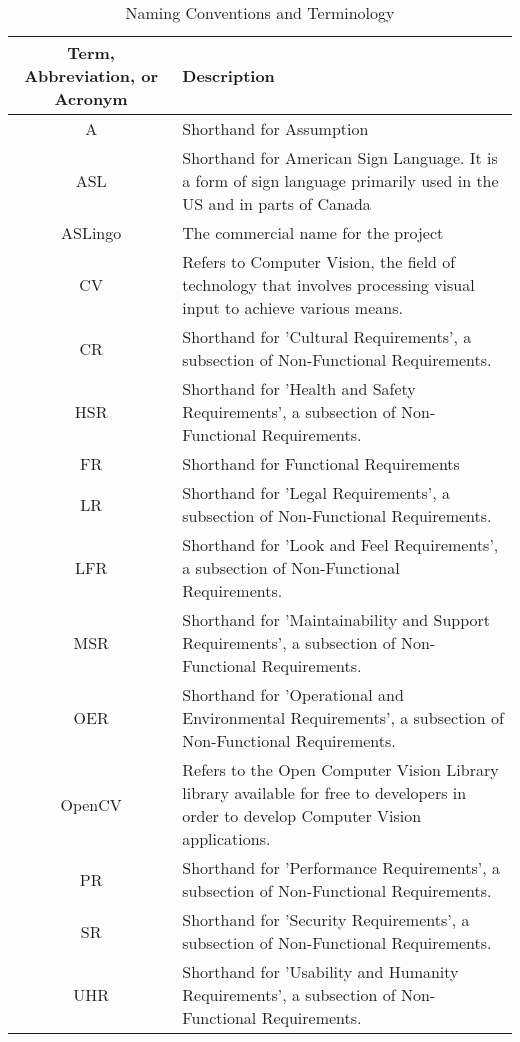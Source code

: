 \documentclass[12pt, titlepage]{article}
\begin{document}
\begin{longtable}{| c | p{7cm} |}
\caption{Naming Conventions and Terminology} \\
\hline
\textbf{Term, Abbreviation, or Acronym} & \textbf{Description}\\
\hline
A & Shorthand for Assumption\\
\hline
ASL & Shorthand for American Sign Language. It is a form of sign language primarily used in the US and in parts of Canada\\
\hline
ASLingo & The commercial name for the project\\
\hline
CV & Refers to Computer Vision, the field of technology that involves processing visual input to achieve various means.\\
\hline
CR & Shorthand for 'Cultural Requirements', a subsection of Non-Functional Requirements.\\
\hline
HSR & Shorthand for 'Health and Safety Requirements', a subsection of Non-Functional Requirements.\\
\hline
FR & Shorthand for Functional Requirements\\
\hline
LR & Shorthand for 'Legal Requirements', a subsection of Non-Functional Requirements.\\
\hline
LFR & Shorthand for 'Look and Feel Requirements', a subsection of Non-Functional Requirements.\\
\hline
MSR & Shorthand for 'Maintainability and Support Requirements', a subsection of Non-Functional Requirements.\\
\hline
OER & Shorthand for 'Operational and Environmental Requirements', a subsection of Non-Functional Requirements.\\
\hline
OpenCV & Refers to the Open Computer Vision Library library available for free to developers in order to develop Computer Vision applications.\\
\hline
PR & Shorthand for 'Performance Requirements', a subsection of Non-Functional Requirements.\\
\hline
SR & Shorthand for 'Security Requirements', a subsection of Non-Functional Requirements.\\
\hline
UHR & Shorthand for 'Usability and Humanity Requirements', a subsection of Non-Functional Requirements.\\
\bottomrule
\end{longtable}

\newpage

\end{document}
